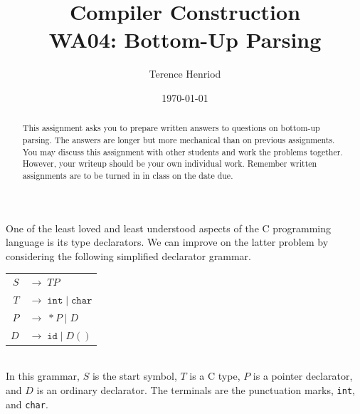 \documentclass[fleqn]{article}
\title{Compiler Construction \\ WA04: Bottom-Up Parsing}
\author{Terence Henriod}
\date{\today}
\begin{document}
\clearpage            %
\maketitle            %
\thispagestyle{empty} %

\begin{abstract}
\noindent This assignment asks you to prepare written answers to questions on
bottom-up parsing. The answers are longer but more mechanical than on previous
assignments. You may discuss this assignment with other students and work the
problems together. However, your writeup should be your own individual work.
Remember written assignments are to be turned in in class on the date due.
\end{abstract}

\newpage
\noindent One of the least loved and least understood aspects of the C
programming language is its type declarators. We can improve on the latter
problem by considering the following simplified declarator grammar.\\

\begin{tabular}{r   l}
$S$ & $\rightarrow \; T P$                                \\
$T$ & $\rightarrow \; \texttt{int} \; | \; \texttt{char}$ \\
$P$ & $\rightarrow \; * P \; | \; D$                      \\
$D$ & $\rightarrow \; \texttt{id} \; | \; D()$            \\
\end{tabular}\\

\noindent In this grammar, $S$ is the start symbol, $T$ is a C type, $P$ is
a pointer declarator, and $D$ is an ordinary declarator. The terminals are
the punctuation marks, \texttt{int}, and \texttt{char}.
\end{document}
